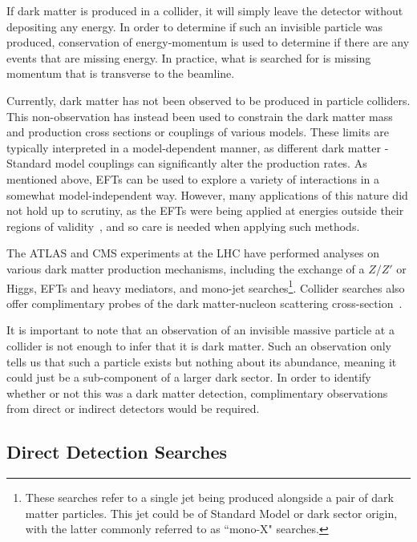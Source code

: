 If dark matter is produced in a collider, it will simply leave the detector without depositing any energy. In order to determine if such an invisible particle was produced, conservation of energy-momentum is used to determine if there are any events that are missing energy. In practice, what is searched for is missing momentum that is transverse to the beamline.

Currently, dark matter has not been observed to be produced in particle colliders. This non-observation has instead been used to constrain the dark matter mass and production cross sections or couplings of various models. 
These limits are typically interpreted in a model-dependent manner, as different dark matter - Standard model couplings can significantly alter the production rates.
As mentioned above, EFTs can be used to explore a variety of interactions in a somewhat model-independent way.
However, many applications of this nature did not hold up to scrutiny, as the EFTs were being applied at energies outside their regions of validity~\cite{Busoni:2013lha_jan_ValidityEffectiveField, Buchmueller:2013dya_EffectiveFieldTheory, Busoni:2014haa_ValidityEffectiveField, Busoni:2014sya_ValidityEffectiveField}, and so care is needed when applying such methods. 

 The ATLAS and CMS experiments at the LHC have performed analyses on various dark matter production mechanisms, including the exchange of a $Z/Z'$ or Higgs, EFTs and heavy mediators, and mono-jet searches\footnote{These searches refer to a single jet being produced alongside a pair of dark matter particles. This jet could be of Standard Model or dark sector origin, with the latter commonly referred to as ``mono-X" searches.}\cite{CMS:2017jdm_jul_Searchdarkmatter, CMS:2017jdm_jul_Searchdarkmattera}. Collider searches also offer complimentary probes of the dark matter-nucleon scattering cross-section~\cite{Ruppin:2014bra_oct_Complementaritydarkmatter}. 
 
 It is important to note that an observation of an invisible massive particle at a collider is not enough to infer that it is dark matter. Such an observation only tells us that such a particle exists but nothing about its abundance, meaning it could just be a sub-component of a larger dark sector. In order to identify whether or not this was a dark matter detection, complimentary observations from direct or indirect detectors would be required. 
 
\subsection{Direct Detection Searches}

